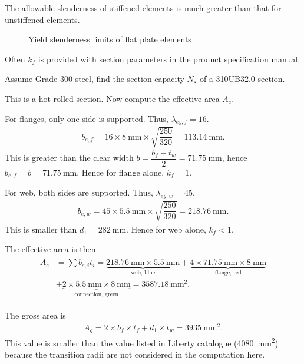 The allowable slenderness of stiffened elements is much greater than that for unstiffened elements.
\begin{figure}[H]
\centering

\caption{Yield slenderness limits of flat plate elements}\label{fig:flat_slenderness}
\end{figure}

Often $k_f$ is provided with section parameters in the product specification manual.

\begin{exmp}
Assume Grade 300 steel, find the section capacity $N_s$ of a 310UB32.0 section.
\end{exmp}
\begin{solution}
\begin{minipage}{5cm}\centering
\end{minipage}
\begin{minipage}{.99\linewidth-5cm}
This is a hot-rolled section. Now compute the effective area $A_e$.

For flanges, only one side is supported. Thus, $\lambda_{ey,f}=16$.
\begin{gather*}
b_{e,f}=16\times\SI{8}{\mm}\times\sqrt{\dfrac{250}{320}}=\SI{113.14}{\mm}.
\end{gather*}
This is greater than the clear width $b=\dfrac{b_f-t_w}{2}=\SI{71.75}{\mm}$, hence $b_{e,f}=b=\SI{71.75}{\mm}$. Hence for flange alone, $k_f=1$.

For web, both sides are supported. Thus, $\lambda_{ey,w}=45$.
\begin{gather*}
b_{e,w}=45\times\SI{5.5}{\mm}\times\sqrt{\dfrac{250}{320}}=\SI{218.76}{\mm}.
\end{gather*}
This is smaller than $d_1=\SI{282}{\mm}$. Hence for web alone, $k_f<1$.
\end{minipage}

The effective area is then
\begin{gather*}
\begin{split}
A_e&=\sum{}b_{e,i}t_i=\underbrace{\SI{218.76}{\mm}\times\SI{5.5}{\mm}}_\text{web, blue}+\underbrace{4\times\SI{71.75}{\mm}\times\SI{8}{\mm}}_\text{flange, red}\\
&+\underbrace{2\times\SI{5.5}{\mm}\times\SI{8}{\mm}}_\text{connection, green}=\SI{3587.18}{\mm^2}.
\end{split}
\end{gather*}

The gross area is
\begin{gather*}
A_g=2\times{}b_f\times{}t_f+d_1\times{}t_w=\SI{3935}{\mm^2}.
\end{gather*}
This value is smaller than the value listed in Liberty catalogue (\SI{4080}{\mm^2}) because the transition radii are not considered in the computation here.


\end{solution}

